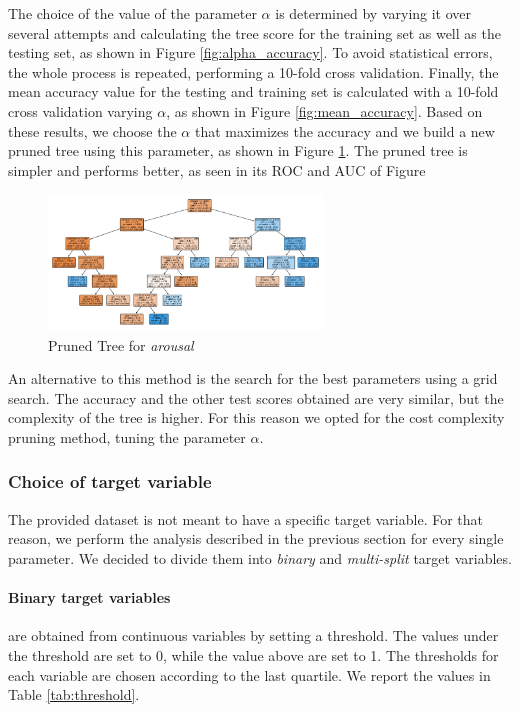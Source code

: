\documentclass[a4paper,11pt,dvipsnames]{article}
\begin{document}
The choice of the value of the parameter $\alpha$ is determined by varying it over several attempts and calculating the tree score for the training set as well as the testing set, as shown in Figure \ref{fig:alpha_accuracy}. To avoid statistical errors, the whole process is repeated, performing a 10-fold cross validation. Finally, the mean accuracy value for the testing and training set is calculated with a 10-fold cross validation varying $\alpha$, as shown in Figure \ref{fig:mean_accuracy}.
Based on these results, we choose the $\alpha$ that maximizes the accuracy and we build a new pruned tree using this parameter, as shown in Figure \ref{fig:pruned}. The pruned tree is simpler and performs better, as seen in its ROC and AUC of Figure 

\begin{figure}[h]
    \centering
    \includegraphics[width=0.65\textwidth]{pruned_tree_arousal.png}
    \caption{Pruned Tree for \textit{arousal}}
    \label{fig:pruned}
\end{figure}

An alternative to this method is the search for the best parameters using a grid search. The accuracy and the other test scores obtained are very similar, but the complexity of the tree is higher. For this reason we opted for the cost complexity pruning method, tuning the parameter $\alpha$.


\subsubsection{Choice of target variable}\label{target_dt}

The provided dataset is not meant to have a specific target variable. For that reason, we perform the analysis described in the previous section for every single parameter. We decided to divide them into \textit{binary} and \textit{multi-split} target variables. 

\paragraph{Binary target variables} are obtained from continuous variables by setting a threshold. The values under the threshold are set to 0, while the value above are set to 1. The thresholds for each variable are chosen according to the last quartile. We report the values in Table \ref{tab:threshold}.
\end{document}
